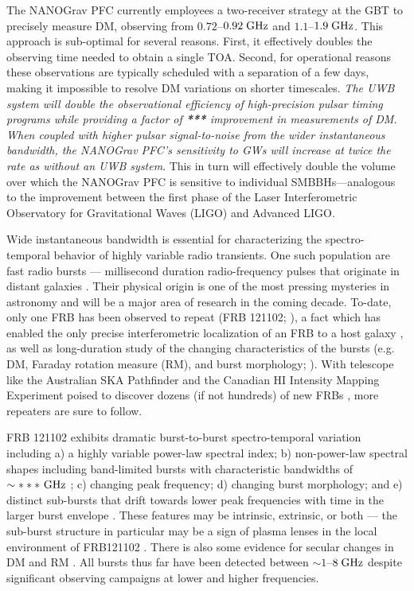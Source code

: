 \documentclass[10pt]{myNSF}
\begin{document}
The NANOGrav PFC currently employees a two-receiver strategy at the
GBT to precisely measure DM, observing from $0.72$--$0.92\; \textrm{GHz}$ and
$1.1$--$1.9\; \textrm{GHz}$.  This approach is sub-optimal for several reasons.
First, it effectively doubles the observing time needed to obtain a
single TOA.  Second, for operational reasons these observations are
typically scheduled with a separation of a few days, making it
impossible to resolve DM variations on shorter timescales.  \emph{The
  UWB system will double the observational efficiency of
  high-precision pulsar timing programs while providing a factor of
  \textbf{***} improvement in measurements of DM.  When coupled with
  higher pulsar signal-to-noise from the wider instantaneous
  bandwidth, the NANOGrav PFC's sensitivity to GWs will increase at
  twice the rate as without an UWB system}.  This in turn will
effectively double the volume over which the NANOGrav PFC is sensitive
to individual SMBBHs---analogous to the improvement between the first
phase of the Laser Interferometric Observatory for Gravitational Waves
(LIGO) and Advanced LIGO.

 Wide instantaneous bandwidth is
essential for characterizing the spectro-temporal behavior of highly
variable radio transients.  One such population are fast radio bursts
--- millisecond duration radio-frequency pulses that originate in
distant galaxies \citep{lbm+07,tsb+3}.  Their physical origin is one
of the most pressing mysteries in astronomy and will be a major area
of research in the coming decade.  To-date, only one FRB has been
observed to repeat (FRB 121102; \citealt{sch+14,ssh+16a}), a fact which
has enabled the only precise interferometric localization of an FRB to
a host galaxy \citep{clw+17,tbc+17}, as well as long-duration study of
the changing characteristics of the bursts (e.g. DM, Faraday rotation
measure (RM), and burst morphology; \citealt{msh+18}).  With telescope
like the Australian SKA Pathfinder and the Canadian HI Intensity
Mapping Experiment poised to discover dozens (if not hundreds) of new
FRBs \citep{smb+18,chime18}, more repeaters are sure to follow.

FRB 121102 exhibits dramatic burst-to-burst spectro-temporal variation
including a) a highly variable power-law spectral index; b)
non-power-law spectral shapes including band-limited bursts with
characteristic bandwidths of $\sim***\ \GHz$ ; c) changing peak
frequency; d) changing burst morphology; and e) distinct sub-bursts
that drift towards lower peak frequencies with time in the larger
burst envelope \citep{ssh+16b}.  These features may be intrinsic,
extrinsic, or both --- the sub-burst structure in particular may be a
sign of plasma lenses in the local environment of FRB121102
\citep{cwh+17,myc+18}.  There is also some evidence for secular
changes in DM and RM \citep{msh+18,gsp+18}.  All bursts thus far have
been detected between $\sim 1$--$8\; \textrm{GHz}$ despite significant
observing campaigns at lower and higher frequencies.
\end{document}
